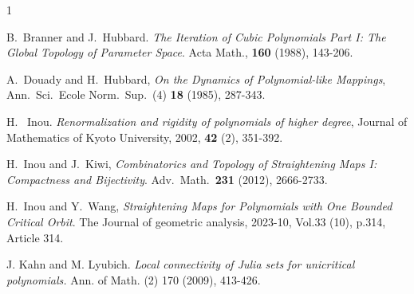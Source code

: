 \documentclass{amsart}
\numberwithin{equation}{section}
\theoremstyle{definition}
\theoremstyle{remark}
\begin{document}
\begin{thebibliography}{1}

 B.\ Branner and J.\ Hubbard. {\em The Iteration of Cubic Polynomials Part I: The Global Topology of Parameter Space}. Acta Math., {\bf 160} (1988), 143-206.




 A.\ Douady and H.\ Hubbard, {\em On the Dynamics of Polynomial-like Mappings}, Ann.\ Sci.\ Ecole Norm.\ Sup.\ (4) {\bf 18} (1985), 287-343.

 H. \ Inou. {\em Renormalization and rigidity of polynomials of higher degree}, Journal of Mathematics of Kyoto University, 2002, {\bf 42} (2), 351-392.

 H.\ Inou and J.\ Kiwi, {\em Combinatorics and Topology of Straightening Maps I: Compactness and Bijectivity}. Adv.\ Math.\ {\bf 231} (2012), 2666-2733.

 H.\ Inou and Y.\ Wang, {\em Straightening Maps for Polynomials with One Bounded Critical Orbit}. The Journal of geometric analysis, 2023-10, Vol.33 (10), p.314, Article 314.


 J. Kahn and M. Lyubich. {\em Local connectivity of {J}ulia sets for unicritical polynomials.} Ann. of Math. (2) 170 (2009), 413-426.
    

\end{thebibliography}
\end{document}
